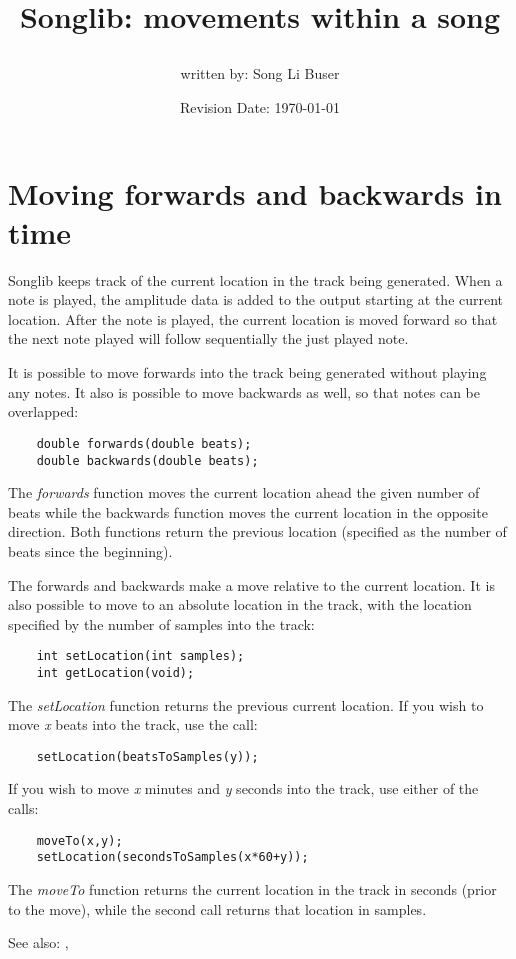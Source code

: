 \documentclass{article}
\title{Songlib: movements within a song\\
\date{Revision Date: \today}}
\author{written by: Song Li Buser}
\begin{document}
\maketitle

\W\subsubsection*{}
\W\htmlrule

\section*{Moving forwards and backwards in time}

Songlib keeps track of the current location in the track
being generated. When a note is played, the amplitude
data is added to the output starting at the current location.
After the note is played, the current location is moved
forward so that the next note played will follow sequentially
the just played note.

It is possible to move forwards into the track being generated
without playing any notes. It also is possible to move
backwards as well, so that notes can be overlapped: 

\begin{verbatim}
    double forwards(double beats);
    double backwards(double beats);
\end{verbatim}

The {\it forwards} function moves the current location ahead the given
number of beats while the backwards function moves the current location
in the opposite direction.
Both functions return the previous location (specified as the number
of beats since the beginning).

The forwards and backwards make a move relative to the current location.
It is also possible to move to an absolute location in the track,
with the location specified by the number of samples into the track:

\begin{verbatim}
    int setLocation(int samples);
    int getLocation(void);
\end{verbatim}

The {\it setLocation} function returns the previous current location.
If you wish to move {\it x} beats into the track, use the call:

\begin{verbatim}
    setLocation(beatsToSamples(y));
\end{verbatim}

If you wish to move {\it x} minutes and {\it y} seconds into the track,
use either of the calls:

\begin{verbatim}
    moveTo(x,y);
    setLocation(secondsToSamples(x*60+y));
\end{verbatim}

The {\it moveTo} function returns the current location in the track in seconds
(prior to the move), while the second call returns that location in samples.

See also:
,
\end{document}
